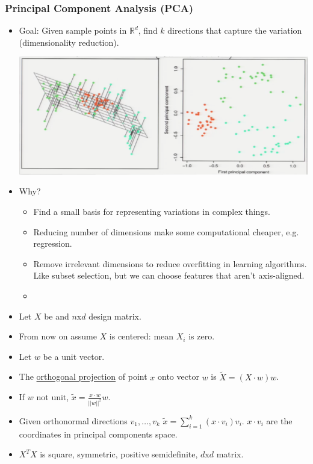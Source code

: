\documentclass[10pt]{article}
\newcommand{\R}{\mathbb{R}}
\begin{document}
	\subsubsection*{Principal Component Analysis (PCA)}
	\begin{itemize}
		\item Goal: Given sample points in $\R^{d}$, find $k$ directions that capture the variation (dimensionality reduction).
			\begin{center}
				\includegraphics[scale=0.6]{../images/pca}
			\end{center}
		\item Why?
			\begin{itemize}
				\item Find a small basis for representing variations in complex things.
				\item Reducing number of dimensions make some computational cheaper, e.g. regression.
				\item Remove irrelevant dimensions to reduce overfitting in learning algorithms. Like subset selection, but we can choose features that aren't axis-aligned.
				\item 
			\end{itemize}
		\item Let $X$ be and $n$x$d$ design matrix.
		\item From now on assume $X$ is centered: mean $X_{i}$ is zero.
		\item Let $w$ be a unit vector.
		\item The \underline{orthogonal projection} of point $x$ onto vector $w$ is $\tilde{X}=(X \cdot w)w$.
		\item If $w$ not unit, $\tilde{x} = \frac{x \cdot w}{||w||^{2}} w$.
		\item Given orthonormal directions $v_{1}, \dots, v_{k}$ $\tilde{x} = \sum_{i=1}^{k} (x \cdot v_{i})v_{i}$. $x \cdot v_{i}$ are the coordinates in principal components space.
		\item $X^{T}X$ is square, symmetric, positive semidefinite, $d$x$d$ matrix.

\end{itemize}
\end{document}

